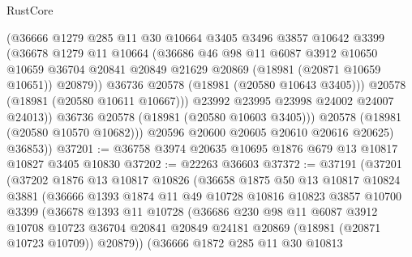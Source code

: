 \begin{lexlean}{RustCore}
\begin{coremodule}
                    (@36666
                      @1279
                      @285
                      @11
                      @30
                      @10664
                      @3405
                      @3496
                      @3857
                      @10642
                      @3399
                      (@36678
                        @1279
                        @11
                        @10664
                        (@36686
                          @46
                          @98
                          @11
                          @6087
                          @3912
                          @10650
                          @10659
                          @36704
                          @20841
                          @20849
                          @21629
                          @20869
                          (@18981 (@20871 @10659 @10651))
                          @20879))
                      @36736
                      @20578
                      (@18981 (@20580 @10643 @3405)))
                    @20578
                    (@18981 (@20580 @10611 @10667)))
                  @23992
                  @23995
                  @23998
                  @24002
                  @24007
                  @24013))
              @36736
              @20578
              (@18981 (@20580 @10603 @3405)))
            @20578
            (@18981 (@20580 @10570 @10682)))
          @20596
          @20600
          @20605
          @20610
          @20616
          @20625)
        @36853))
@37201 := @36758 @3974 @20635 @10695 @1876 @679 @13 @10817 @10827 @3405 @10830
@37202 := @22263 @36603
@37372 := @37191
    (@37201
      (@37202
        @1876
        @13
        @10817
        @10826
        (@36658
          @1875
          @50
          @13
          @10817
          @10824
          @3881
          (@36666
            @1393
            @1874
            @11
            @49
            @10728
            @10816
            @10823
            @3857
            @10700
            @3399
            (@36678
              @1393
              @11
              @10728
              (@36686
                @230
                @98
                @11
                @6087
                @3912
                @10708
                @10723
                @36704
                @20841
                @20849
                @24181
                @20869
                (@18981 (@20871 @10723 @10709))
                @20879))
            (@36666
              @1872
              @285
              @11
              @30
              @10813

\end{coremodule}
\end{lexlean}
